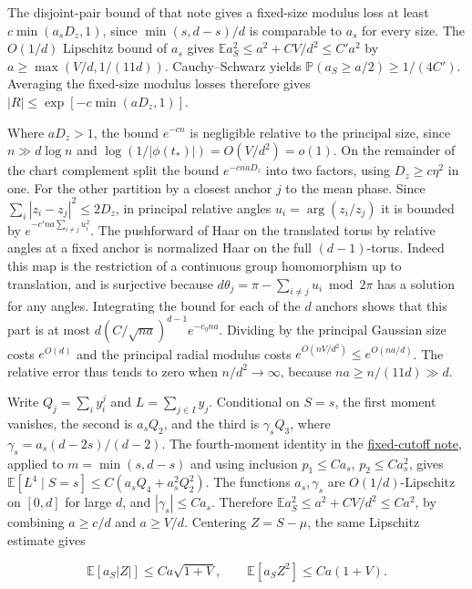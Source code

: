 The disjoint-pair bound of that note gives a fixed-size modulus loss at least $c\min(a_sD_z,1)$, since $\min(s,d-s)/d$ is comparable to $a_s$ for every size. The $O(1/d)$ Lipschitz bound of $a_s$ gives $\mathbb E a_S^2\le a^2+C V/d^2\le C'a^2$ by $a\ge \max(V/d,1/(11d))$. Cauchy--Schwarz yields $\mathbb P(a_S\ge a/2)\ge1/(4C')$. Averaging the fixed-size modulus losses therefore gives
$|R|\le \exp[-c\min(aD_z,1)]$.

Where $aD_z>1$, the bound $e^{-cn}$ is negligible relative to the principal size, since $n\gg d\log n$ and $\log(1/|\phi(t_*)|)=O(V/d^2)=o(1)$. On the remainder of the chart complement split the bound $e^{-cnaD_z}$ into two factors, using $D_z\ge c\eta^2$ in one. For the other partition by a closest anchor $j$ to the mean phase. Since $\sum_i|z_i-z_j|^2\le2D_z$, in principal relative angles $u_i=\arg(z_i/z_j)$ it is bounded by $e^{-c'na\sum_{i\ne j}u_i^2}$. The pushforward of Haar on the translated torus by relative angles at a fixed anchor is normalized Haar on the full $(d-1)$-torus. Indeed this map is the restriction of a continuous group homomorphism up to translation, and is surjective because $d\theta_j=\pi-\sum_{i\ne j}u_i\bmod2\pi$ has a solution for any angles. Integrating the bound for each of the $d$ anchors shows that this part is at most
$d(C/\sqrt{na})^{d-1}e^{-c_\eta na}$.
Dividing by the principal Gaussian size costs $e^{O(d)}$ and the principal radial modulus costs $e^{O(nV/d^2)}\le e^{O(na/d)}$. The relative error thus tends to zero when $n/d^2\to\infty$, because $na\ge n/(11d)\gg d$.

Write $Q_j=\sum_i y_i^j$ and $L=\sum_{j\in I}y_j$. Conditional on $S=s$, the first moment vanishes, the second is $a_sQ_2$, and the third is $\gamma_s Q_3$, where $\gamma_s=a_s(d-2s)/(d-2)$. The fourth-moment identity in the \href{https://github.com/ProgramComputer/open-math-research/blob/04564a728c21eab6ce511b98a48ccaac754648ff/topics/balanced-arrays/very-tall/very-tall-interior-saddle.md}{fixed-cutoff note}, applied to $m=\min(s,d-s)$ and using inclusion $p_1\le Ca_s$, $p_2\le C a_s^2$, gives $\mathbb E[L^4\mid S=s]\le C(a_sQ_4+a_s^2 Q_2^2)$. The functions $a_s,\gamma_s$ are $O(1/d)$-Lipschitz on $[0,d]$ for large $d$, and $|\gamma_s|\le Ca_s$. Therefore $\mathbb E a_S^2\le a^2+C V/d^2\le C a^2$, by combining $a\ge c/d$ and $a\ge V/d$. Centering $Z=S-\mu$, the same Lipschitz estimate gives

\begin{equation*}
\mathbb E[a_S|Z|]\le Ca\sqrt{1+V},\qquad
\mathbb E[a_S Z^2]\le C a(1+V).
\end{equation*}

